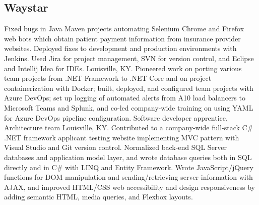 \subsection{Waystar}
{Fixed bugs in Java Maven projects automating Selenium Chrome and Firefox web bots which obtain patient payment information from insurance provider websites. Deployed fixes to development and production environments with Jenkins. Used Jira for project management, SVN for version control, and Eclipse and Intellij Idea for IDEs.
}
{Louisville, KY. Pioneered work on porting various team projects from .NET Framework to .NET Core and on project containerization with Docker; built, deployed, and configured team projects with Azure DevOps; set up logging of automated alerts from A10 load balancers to Microsoft Teams and Splunk, and co-led company-wide training on using YAML for Azure DevOps pipeline configuration.
}
{}
{Software developer apprentice, Architecture team}
{Louisville, KY. Contributed to a company-wide full-stack C\# .NET framework applicant testing website implementing MVC pattern with Visual Studio and Git version control. Normalized back-end SQL Server databases and application model layer, and wrote database queries both in SQL directly and in C\# with LINQ and Entity Framework. Wrote JavaScript/jQuery functions for DOM manipulation and sending/retrieving server information with AJAX, and improved HTML/CSS web accessibility and design responsiveness by adding semantic HTML, media queries, and Flexbox layouts. }
